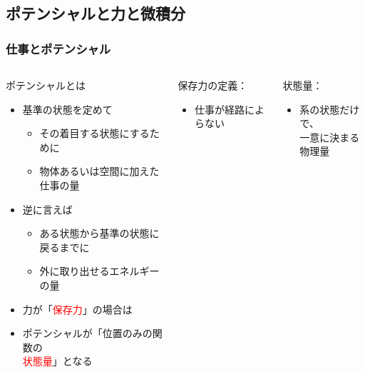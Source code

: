 \documentclass[unicode,12pt,aspectratio=169]{beamer}
\begin{document}
\subsection{ポテンシャルと力と微積分}
\begin{frame}
	\frametitle{仕事とポテンシャル}
		\begin{columns}[c, onlytextwidth]
				\begin{block}{ポテンシャルとは}
			\begin{itemize}
				\item \alert{基準の状態}を定めて
				\begin{itemize}
					\item その着目する状態にするために
					\item 物体あるいは空間に加えた\alert{仕事の量}
				\end{itemize}
				\item 逆に言えば
				\begin{itemize}
					\item ある状態から基準の状態に戻るまでに
					\item \alert{外に取り出せるエネルギーの量}
				\end{itemize}
				\item 力が「\textcolor{red}{保存力}」の場合は
				\item ポテンシャルが「位置のみの関数の\\\textcolor{red}{状態量}」となる
			\end{itemize}
		\end{block}
				\begin{block}{保存力の定義：}
					\begin{itemize}
						\item 仕事が経路によらない
					\end{itemize}
				\end{block}

				\begin{block}{状態量：}
					\begin{itemize}
						\item 系の状態だけで、\\一意に決まる物理量
					\end{itemize}
				\end{block}
		\end{columns}
\end{frame}
\end{document}
